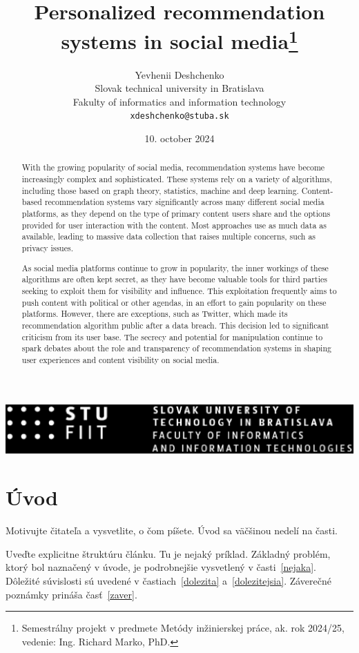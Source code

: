 \documentclass[10pt,twocolumn,twoside,slovak,a4paper]{report} %
\title{Personalized recommendation systems in social media\thanks{Semestrálny projekt v predmete Metódy inžinierskej práce, ak. rok 2024/25, vedenie: Ing. Richard Marko, PhD.}} %
\author{Yevhenii Deshchenko\\[2pt]
	{\small Slovak technical university in Bratislava}\\
	{\small Fakulty of informatics and information technology}\\
	{\small \texttt{xdeshchenko@stuba.sk}}
	}
\date{\small 10. october 2024} %
\begin{document}
\maketitle

\begin{abstract}
With the growing popularity of social media, recommendation systems have become increasingly complex and sophisticated.
These systems rely on a variety of algorithms, including those based on graph theory, statistics, machine and deep learning.
Content-based recommendation systems vary significantly across many different social media platforms, as they depend on the
type of primary content users share and the options provided for user interaction with the content.
Most approaches use as much data as available, leading to massive data collection that raises multiple concerns, such as privacy issues.

As social media platforms continue to grow in popularity, the inner workings of these algorithms are often kept secret,
as they have become valuable tools for third parties seeking to exploit them for visibility and influence.
This exploitation frequently aims to push content with political or other agendas, in an effort to gain popularity on these platforms.
However, there are exceptions, such as Twitter, which made its recommendation algorithm public after a data breach.
This decision led to significant criticism from its user base. The secrecy and potential for manipulation continue to spark debates
about the role and transparency of recommendation systems in shaping user experiences and content visibility on social media.
\end{abstract}

\includegraphics[width=\textwidth]{fiit.eps}

\section{Úvod}

Motivujte čitateľa a vysvetlite, o čom píšete. Úvod sa väčšinou nedelí na časti.

Uveďte explicitne štruktúru článku. Tu je nejaký príklad.
Základný problém, ktorý bol naznačený v úvode, je podrobnejšie vysvetlený v časti~\ref{nejaka}.
Dôležité súvislosti sú uvedené v častiach~\ref{dolezita} a~\ref{dolezitejsia}.
Záverečné poznámky prináša časť~\ref{zaver}.
\end{document}

